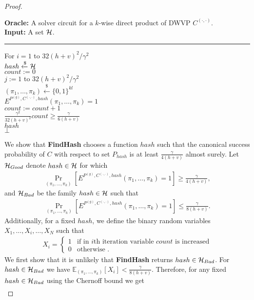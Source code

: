 \begin{proof}
\begin{codeblock}
  \textbf{Oracle:} A solver circuit for a $k$-wise direct product of DWVP $C^{(\cdot, \cdot)}$. \\
  \textbf{Input:} A set $\mathcal{H}$.
  \medskip\hrule\medskip
  For $i = 1$ to $32(h+v)^2/\gamma^2$ \\
  \IndI $hash \xleftarrow{\$} \mathcal{H}$ \\
  \IndI $count := 0$ \\
  \IndI \For $j := 1$ to $32(h+v)^2/\gamma^2$ \\
  \IndII $(\pi_1, \dots, \pi_k) \xleftarrow{\$} \{0,1\}^{kl} $\\
  \IndII \If $E^{P^{(g)}, C^{(\cdot, \cdot)}, hash}(\pi_1, \dots, \pi_k) = 1$ \then \\
  \IndIII $count := count + 1$\\
  \IndI \If $\frac{\gamma^2}{32(h+v)^2} count \geq \frac{\gamma}{6(h+v)}$ \\
  \IndII \return $hash$\\
  \return $\bot$
\end{codeblock}
We show that \textbf{FindHash} chooses a function $hash$ such
that the canonical success probability of $C$
with respect to set $P_{hash}$ is at least $\frac{\gamma}{4(h+v)}$ almost surely.
Let $\mathcal{H}_{Good}$ denote $hash \in \mathcal{H}$ for which
\begin{align*}
\underset{(\pi_1, \dots, \pi_k)}{\Pr}[E^{P^{(g)}, C^{(\cdot, \cdot)}, hash}(\pi_1, \dots, \pi_k) = 1] \geq \frac{\gamma}{4(h+v)},
\end{align*}
and $\mathcal{H}_{Bad}$ be the family $hash \in \mathcal{H}$ such that
\begin{align*}
\underset{(\pi_1, \dots, \pi_k)}{\Pr}[E^{P^{(g)}, C^{(\cdot, \cdot)}, hash}(\pi_1, \dots, \pi_k) = 1] \leq \frac{\gamma}{8(h+v)}.
\end{align*}
Additionally, for a fixed $hash$, we define the binary random variables $X_1, \dots, X_i, \dots, X_N$ such that
\begin{align*}
  X_i =
  \begin{cases}
    1 & \text{if in $i$th iteration variable $count$ is increased}\\
    0 & \text{otherwise .}
  \end{cases}
\end{align*}
We first show that it is unlikely that \textbf{FindHash} returns $hash \in \mathcal{H}_{Bad}$.
For $hash \in \mathcal{H}_{Bad}$ we have $\mathbb{E}_{(\pi_1, \dots, \pi_k)}[X_i] < \frac{\gamma}{8(h+v)}$.
Therefore, for any fixed $hash \in \mathcal{H}_{Bad}$ using the Chernoff bound we get
\begin{align*}

\end{align*}
\end{proof}
